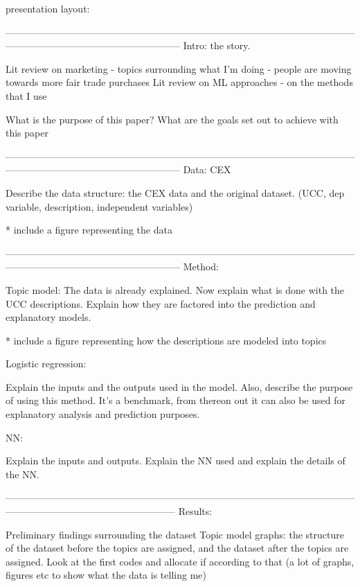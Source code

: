 presentation layout:



------------------------------------------------------------------------------------------------------------------------------------------------------------------
Intro: the story. 

Lit review on marketing - topics surrounding what I'm doing - people are moving towards more fair trade purchases
Lit review on ML approaches - on the methods that I use 

What is the purpose of this paper?
What are the goals set out to achieve with this paper


------------------------------------------------------------------------------------------------------------------------------------------------------------------
Data: CEX

Describe the data structure: the CEX data and the original dataset. (UCC, dep variable, description, independent variables)

* include a figure representing the data 


------------------------------------------------------------------------------------------------------------------------------------------------------------------
Method: 

Topic model:
The data is already explained. Now explain what is done with the UCC descriptions. Explain how they are factored into the prediction and explanatory models. 

* include a figure representing how the descriptions are modeled into topics

Logistic regression:

Explain the inputs and the outputs used in the model. Also, describe the purpose of using this method. It's a benchmark, from thereon out it can also be used for explanatory analysis and prediction purposes.


NN:

Explain the inputs and outputs. Explain the NN used and explain the details of the NN. 


-----------------------------------------------------------------------------------------------------------------------------------------------------------------
Results:

Preliminary findings surrounding the dataset 
Topic model graphs: the structure of the dataset before the topics are assigned, and the dataset after the topics are assigned. Look at the first codes and allocate if according to that
 (a lot of graphs, figures etc to show what the data is telling me)




